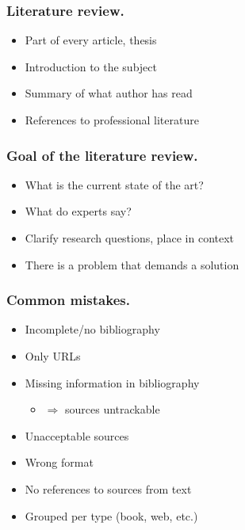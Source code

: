 \documentclass[aspectratio=169]{beamer}
\begin{document}
\begin{frame}
    \frametitle{Literature review.}

    \begin{itemize}
        \item Part of every article, thesis
        \item Introduction to the subject
        \item Summary of what author has read
        \item References to professional literature
    \end{itemize}

\end{frame}

\begin{frame}
    \frametitle{Goal of the literature review.}

    \begin{itemize}
        \item What is the current state of the art?
        \item What do experts say?
        \item Clarify research questions, place in context
        \item There is a problem that demands a solution
    \end{itemize}

    \bigskip

\end{frame}

\begin{frame}
    \frametitle{Common mistakes.}

    \begin{itemize}
        \item Incomplete/no bibliography
        \item Only URLs
        \item Missing information in bibliography
              \begin{itemize}
                  \item \(\Rightarrow\) sources untrackable
              \end{itemize}
        \item Unacceptable sources
        \item Wrong format
        \item No references to sources from text
        \item Grouped per type (book, web, etc.)
    \end{itemize}
\end{frame}
\end{document}
